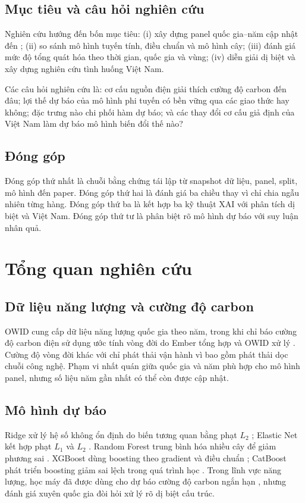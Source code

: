 \documentclass[12pt,a4paper,oneside]{report}
\begin{document}
\section{Mục tiêu và câu hỏi nghiên cứu}
Nghiên cứu hướng đến bốn mục tiêu: (i) xây dựng panel quốc gia--năm cập nhật đến \LatestSourceYear; (ii) so sánh mô hình tuyến tính, điều chuẩn và mô hình cây; (iii) đánh giá mức độ tổng quát hóa theo thời gian, quốc gia và vùng; (iv) diễn giải dị biệt và xây dựng nghiên cứu tình huống Việt Nam.

Các câu hỏi nghiên cứu là: cơ cấu nguồn điện giải thích cường độ carbon đến đâu; lợi thế dự báo của mô hình phi tuyến có bền vững qua các giao thức hay không; đặc trưng nào chi phối hàm dự báo; và các thay đổi cơ cấu giả định của Việt Nam làm dự báo mô hình biến đổi thế nào?

\section{Đóng góp}
Đóng góp thứ nhất là chuỗi bằng chứng tái lập từ snapshot dữ liệu, panel, split, mô hình đến paper. Đóng góp thứ hai là đánh giá ba chiều thay vì chỉ chia ngẫu nhiên từng hàng. Đóng góp thứ ba là kết hợp ba kỹ thuật XAI với phân tích dị biệt và Việt Nam. Đóng góp thứ tư là phân biệt rõ mô hình dự báo với suy luận nhân quả.

\chapter{Tổng quan nghiên cứu}
\section{Dữ liệu năng lượng và cường độ carbon}
OWID cung cấp dữ liệu năng lượng quốc gia theo năm, trong khi chỉ báo cường độ carbon điện sử dụng ước tính vòng đời do Ember tổng hợp và OWID xử lý \cite{owidcarbon,owidenergy}. Cường độ vòng đời khác với chỉ phát thải vận hành vì bao gồm phát thải dọc chuỗi công nghệ. Phạm vi nhất quán giữa quốc gia và năm phù hợp cho mô hình panel, nhưng số liệu năm gần nhất có thể còn được cập nhật.

\section{Mô hình dự báo}
Ridge xử lý hệ số không ổn định do biến tương quan bằng phạt $L_2$ \cite{hoerl1970}; Elastic Net kết hợp phạt $L_1$ và $L_2$ \cite{zou2005}. Random Forest trung bình hóa nhiều cây để giảm phương sai \cite{breiman2001}. XGBoost dùng boosting theo gradient và điều chuẩn \cite{chen2016}; CatBoost phát triển boosting giảm sai lệch trong quá trình học \cite{prokhorenkova2018}. Trong lĩnh vực năng lượng, học máy đã được dùng cho dự báo cường độ carbon ngắn hạn \cite{dayahead2023}, nhưng đánh giá xuyên quốc gia đòi hỏi xử lý rõ dị biệt cấu trúc.
\end{document}

